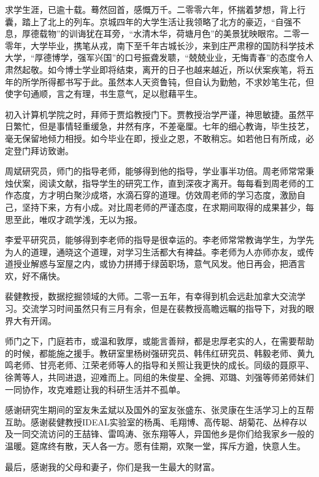 

\begin{ack}
求学生涯，已逾十载。蓦然回首，感慨万千。二零零六年，怀揣着梦想，背上行囊，踏上了北上的列车。京城四年的大学生活让我领略了北方的豪迈，“自强不息，厚德载物”的训诲犹在耳旁，“水清木华，荷塘月色”的美景犹映眼帘。二零一零年，大学毕业，携笔从戎，南下至千年古城长沙，来到庄严肃穆的国防科学技术大学，“厚德博学，强军兴国”的口号振聋发聩，“兢兢业业，无悔青春”的态度令人肃然起敬。如今博士学业即将结束，离开的日子也越来越近，所以伏案疾笔，将五年的所学所得都书写于此。虽然本人天资鲁钝，但自认为勤勉，不求妙笔生花，但使字句通顺，言之有理，书生意气，足以慰藉平生。

初入计算机学院之时，拜师于贾焰教授门下。贾教授治学严谨，神思敏捷。虽然平日繁忙，但是事情轻重缓急，井然有序，不差毫厘。七年的细心教诲，毕生技艺，毫无保留地倾力相授。如今毕业在即，授业之恩，不敢稍忘。如若他日有所成，必定登门拜访致谢。

周斌研究员，师门的指导老师，能够得到他的指导，学业事半功倍。周老师常常秉烛伏案，阅读文献，指导学生的研究工作，直到深夜才离开。每每看到周老师的工作态度，方才明白聚沙成塔，水滴石穿的道理。仿效周老师的学习态度，激励自己，坚持下来，方有小成。对比周老师的严谨态度，在求期间取得的成果甚少，每思至此，唯叹才疏学浅，无以为报。

李爱平研究员，能够得到李老师的指导是很幸运的。李老师常常教诲学生，为学先为人的道理，通晓这个道理，对学习生活都大有裨益。李老师为人亦师亦友，或传道授业解惑与室屋之内，或协力拼搏于绿茵职场，意气风发。他日再会，把酒言欢，好不痛快。

裴健教授，数据挖掘领域的大师。二零一五年，有幸得到机会远赴加拿大交流学习。交流学习时间虽然只有三月有余，但是在裴教授高瞻远瞩的指导下，对我的眼界大有开阔。

师门之下，门庭若市，或温和敦厚，或能言善辩，都是忠厚老实的人，在需要帮助的时候，都能施之援手。教研室里杨树强研究员、韩伟红研究员、韩毅老师、黄九鸣老师、甘亮老师、江荣老师等人的指导和关照让我更快的成长。同级的聂原平、徐菁等人，共同进退，迎难而上。同组的朱俊星、全拥、邓璐、刘强等师弟师妹们一同协作，攻克难题让我的科研生活并不孤单。

感谢研究生期间的室友朱孟斌以及国外的室友张盛东、张灵康在生活学习上的互帮互助。感谢裴健教授IDEAL实验室的杨禹、毛翔博、高传聪、胡菊花、丛梓存以及一同交流访问的王喆锋、雷鸣涛、张东翔等人，异国他乡是你们给我家乡一般的温暖。筵席终有散，天人各一方。愿有佳期，欢聚一堂，挥斥方遒，快意人生。

最后，感谢我的父母和妻子，你们是我一生最大的财富。
\end{ack}
